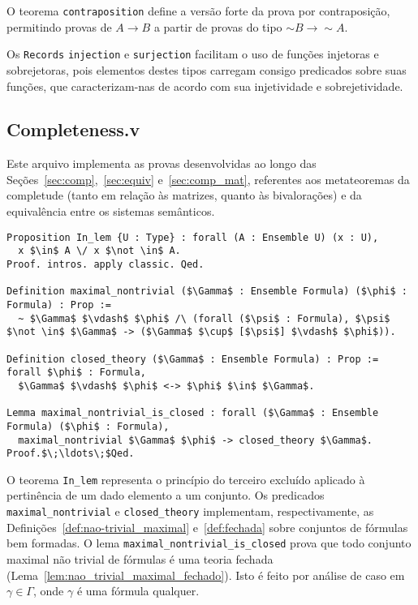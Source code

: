           O teorema \texttt{contraposition} define a versão forte da prova por contraposição, permitindo provas de $A \to B$ a partir de provas do tipo $\sim B \to \sim A$.
          
          Os \texttt{Records} \texttt{injection} e \texttt{surjection} facilitam o uso de funções injetoras e sobrejetoras, pois elementos destes tipos carregam consigo predicados sobre suas funções, que caracterizam-nas de acordo com sua injetividade e sobrejetividade.

    
    \subsection{Completeness.v}\label{sec:completeness}
        
        Este arquivo implementa as provas desenvolvidas ao longo das Seções~\ref{sec:comp},~\ref{sec:equiv} e~\ref{sec:comp_mat}, referentes aos metateoremas da completude (tanto em relação às matrizes, quanto às bivalorações) e da equivalência entre os sistemas semânticos.

        \begin{lstlisting}[name=Completeness, frame=single, language=coq]
Proposition In_lem {U : Type} : forall (A : Ensemble U) (x : U),
  x $\in$ A \/ x $\not \in$ A.
Proof. intros. apply classic. Qed.

Definition maximal_nontrivial ($\Gamma$ : Ensemble Formula) ($\phi$ : Formula) : Prop :=
  ~ $\Gamma$ $\vdash$ $\phi$ /\ (forall ($\psi$ : Formula), $\psi$ $\not \in$ $\Gamma$ -> ($\Gamma$ $\cup$ [$\psi$] $\vdash$ $\phi$)).

Definition closed_theory ($\Gamma$ : Ensemble Formula) : Prop := forall $\phi$ : Formula, 
  $\Gamma$ $\vdash$ $\phi$ <-> $\phi$ $\in$ $\Gamma$.

Lemma maximal_nontrivial_is_closed : forall ($\Gamma$ : Ensemble Formula) ($\phi$ : Formula),
  maximal_nontrivial $\Gamma$ $\phi$ -> closed_theory $\Gamma$.
Proof.$\;\ldots\;$Qed.
        \end{lstlisting}

        O teorema \texttt{In\_lem} representa o princípio do terceiro excluído aplicado à pertinência de um dado elemento a um conjunto. Os predicados \texttt{maximal\_nontrivial} e \texttt{closed\_theory} implementam, respectivamente, as Definições~\ref{def:nao-trivial_maximal} e~\ref{def:fechada} sobre conjuntos de fórmulas bem formadas. O lema \texttt{maximal\_nontrivial\_is\_closed} prova que todo conjunto maximal não trivial de fórmulas é uma teoria fechada (Lema~\ref{lem:nao_trivial_maximal_fechado}). Isto é feito por análise de caso em $\gamma \in \Gamma$, onde $\gamma$ é uma fórmula qualquer.

